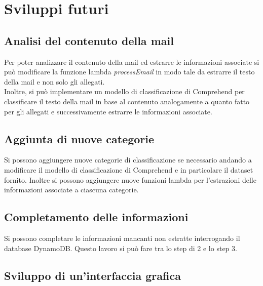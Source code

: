 \chapter{Sviluppi futuri}
\section{Analisi del contenuto della mail}
Per poter analizzare il contenuto della mail ed estrarre le informazioni associate si può modificare la funzione lambda \textit{processEmail} in modo tale da estrarre il testo della mail e non solo gli allegati.\\
Inoltre, si può implementare un modello di classificazione di Comprehend per classificare il testo della mail in base al contenuto analogamente a quanto fatto per gli allegati e successivamente estrarre le informazioni associate. 
\section{Aggiunta di nuove categorie}
Si possono aggiungere nuove categorie di classificazione se necessario andando a modificare il modello di classificazione di Comprehend e in particolare il dataset fornito. Inoltre si possono aggiungere nuove funzioni lambda per l'estrazioni delle informazioni associate a ciascuna categorie. 
\section{Completamento delle informazioni}
Si possono completare le informazioni mancanti non estratte interrogando il database DynamoDB. Questo lavoro si può fare tra lo step di 2 e lo step 3. 
\section{Sviluppo di un'interfaccia grafica}
